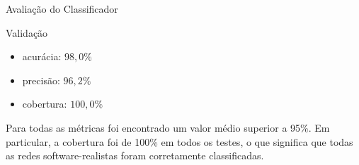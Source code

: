 \begin{section}{Avaliação do Classificador}
\begin{subsection}{Validação}

% 


		\begin{itemize}
			\item acurácia:  $98,0\%$
			\item precisão:  $96,2\%$
			\item cobertura: $100,0\%$
		\end{itemize}

		Para todas as métricas foi encontrado um valor médio superior a 95\%. Em particular, a cobertura foi de 100\% em todos os testes, o que significa que todas as redes software-realistas foram corretamente classificadas. %


\end{subsection}
\end{section}
